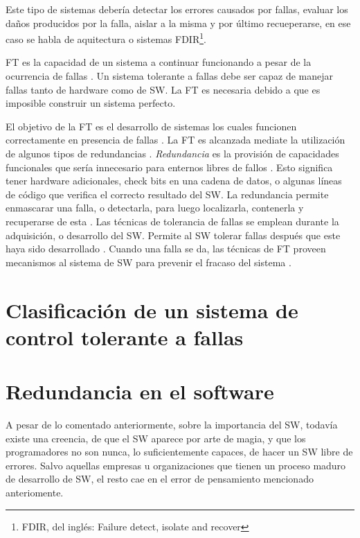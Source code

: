 Este tipo de sistemas debería detectar los errores causados por fallas, evaluar los daños 
producidos por la falla, aislar a la misma y por último recueperarse, en ese caso se habla de 
aquitectura o sistemas \acs{FDIR}\footnote{FDIR, del inglés: Failure detect, isolate and recover}.

\ac{FT} es la capacidad de un sistema a continuar funcionando a pesar de la ocurrencia 
de fallas \citep{FTDesign}. Un sistema tolerante a fallas debe ser capaz de manejar fallas tanto de 
hardware como de \ac{SW}. La \ac{FT} es necesaria debido a que es imposible construir 
un sistema perfecto.

El objetivo de la \ac{FT} es el desarrollo de sistemas los cuales funcionen correctamente en 
presencia de fallas \citep{FTDesign}. La \ac{FT} es alcanzada mediate la utilización de algunos 
tipos de redundancias \citep{FTDesign}. \textit{Redundancia} es la provisión de capacidades 
funcionales que sería innecesario para enternos libres de fallos \citep{FTDesign}. Esto significa 
tener hardware adicionales, check bits en una cadena de datos, o algunas l\'ineas de c\'odigo que 
verifica el correcto resultado del \ac{SW}. La redundancia permite enmascarar una falla, o 
detectarla, para luego localizarla, contenerla y recuperarse de esta \citep{FTDesign}. Las 
técnicas de tolerancia de fallas se emplean durante la adquisición, o desarrollo del \ac{SW}. 
Permite al \ac{SW} tolerar fallas después que este haya sido desarrollado \citep{Pullum01}. Cuando 
una falla se da, las técnicas de \ac{FT} proveen mecanismos al sistema de \ac{SW} para prevenir el 
fracaso del sistema \citep{Pullum01}.

\section{Clasificación de un sistema de control tolerante a fallas}

\section{Redundancia en el software}
A pesar de lo comentado anteriormente, sobre la importancia del \ac{SW}, todavía existe una 
creencia, de que el \ac{SW} aparece por arte de magia, y que los programadores no son nunca, lo 
suficientemente capaces, de hacer un \ac{SW} libre de errores. Salvo aquellas empresas u 
organizaciones que tienen un proceso maduro de desarrollo de \ac{SW}, el resto cae en el error de 
pensamiento mencionado anteriomente. 

